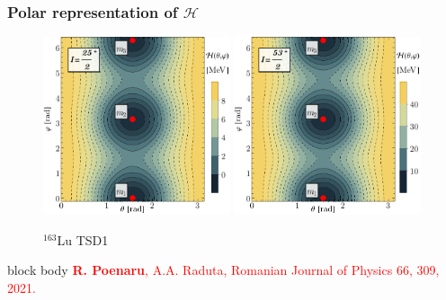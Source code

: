 \documentclass{beamer}
\begin{document}
\begin{frame}
	\frametitle{Polar representation of $\mathcal{H}$}
	\vspace{-1cm}
	\begin{figure}
		\centering
		\caption{$^{163}$Lu TSD1}
		\includegraphics[width=0.49\textwidth]{figures/parity-partners-plots/contour-tsd1-1.pdf}
		\includegraphics[width=0.49\textwidth]{figures/parity-partners-plots/contour-tsd1-2.pdf}
	\end{figure}
	\begin{beamercolorbox}[rounded=true,shadow=false, wd=\linewidth,]{block body}
		\centering
		\textcolor{red}{\footnotesize{\textbf{R. Poenaru}, A.A. Raduta, Romanian Journal of Physics 66, 309, 2021.}}
	\end{beamercolorbox}
\end{frame}
\end{document}
